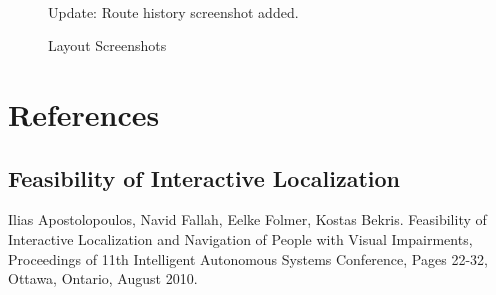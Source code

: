 \documentclass{scrreprt}
\begin{document}
\begin{figure}[ht!]
\begin{center}
{        }\\%
        
        \begin{highlightbox}
        	Update: Route history screenshot added.
        \end{highlightbox}
%
    \end{center}
    \caption{%
        Layout Screenshots
     }%
   \label{fig:subfigures}
\end{figure}
	
\chapter{References}

\section{Feasibility of Interactive Localization}
Ilias Apostolopoulos, Navid Fallah, Eelke Folmer, Kostas Bekris. Feasibility of Interactive Localization and Navigation of People with Visual Impairments, Proceedings of 11th Intelligent Autonomous Systems Conference, Pages 22-32, Ottawa, Ontario, August 2010.\\
 
\end{document}
